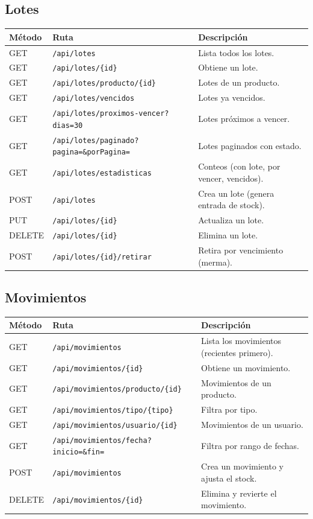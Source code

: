 \documentclass[11pt,a4paper]{article}
\begin{document}
\subsection{Lotes}
\begin{longtable}{p{2cm} p{6.5cm} p{5.5cm}}
\toprule
\textbf{Método} & \textbf{Ruta} & \textbf{Descripción} \\
\midrule
\endhead
GET & \texttt{/api/lotes} & Lista todos los lotes. \\
GET & \texttt{/api/lotes/\{id\}} & Obtiene un lote. \\
GET & \texttt{/api/lotes/producto/\{id\}} & Lotes de un producto. \\
GET & \texttt{/api/lotes/vencidos} & Lotes ya vencidos. \\
GET & \texttt{/api/lotes/proximos-vencer?dias=30} & Lotes próximos a vencer. \\
GET & \texttt{/api/lotes/paginado?pagina=\&porPagina=} & Lotes paginados con estado. \\
GET & \texttt{/api/lotes/estadisticas} & Conteos (con lote, por vencer, vencidos). \\
POST & \texttt{/api/lotes} & Crea un lote (genera entrada de stock). \\
PUT & \texttt{/api/lotes/\{id\}} & Actualiza un lote. \\
DELETE & \texttt{/api/lotes/\{id\}} & Elimina un lote. \\
POST & \texttt{/api/lotes/\{id\}/retirar} & Retira por vencimiento (merma). \\
\bottomrule
\end{longtable}

\subsection{Movimientos}
\begin{longtable}{p{2cm} p{6cm} p{6cm}}
\toprule
\textbf{Método} & \textbf{Ruta} & \textbf{Descripción} \\
\midrule
\endhead
GET & \texttt{/api/movimientos} & Lista los movimientos (recientes primero). \\
GET & \texttt{/api/movimientos/\{id\}} & Obtiene un movimiento. \\
GET & \texttt{/api/movimientos/producto/\{id\}} & Movimientos de un producto. \\
GET & \texttt{/api/movimientos/tipo/\{tipo\}} & Filtra por tipo. \\
GET & \texttt{/api/movimientos/usuario/\{id\}} & Movimientos de un usuario. \\
GET & \texttt{/api/movimientos/fecha?inicio=\&fin=} & Filtra por rango de fechas. \\
POST & \texttt{/api/movimientos} & Crea un movimiento y ajusta el stock. \\
DELETE & \texttt{/api/movimientos/\{id\}} & Elimina y revierte el movimiento. \\
\bottomrule
\end{longtable}
\end{document}
